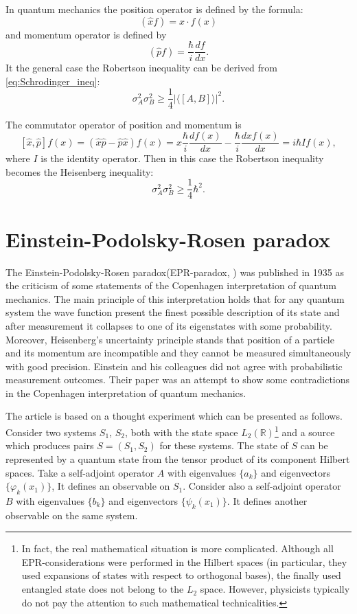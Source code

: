 \documentclass[%
master,         %
subf,           %
href,           %
colorlinks=true %
]{disser}
\numberwithin{equation}{section}
\numberwithin{figure}{section}
\begin{document}
In quantum mechanics the position operator is defined by the formula:
\[
(\hat{x}f) = x\cdot f(x)
\]
and momentum operator is defined by
\[
(\hat{p}f) = \frac{\hbar}{i}\frac{df}{dx}.
\]
It the general case the Robertson inequality can be derived from \eqref{eq:Schrodinger_ineq}:
\[
\sigma_A^2\sigma_B^2 \geq \frac{1}{4}|\langle [A, B]\rangle|^2.
\]

The commutator operator of position and momentum is 
\[
[\hat{x}, \hat{p}]f(x) = (\hat{x}\hat{p} - \hat{p}\hat{x})f(x) = x\frac{\hbar}{i}\frac{df(x)}{dx} - \frac{\hbar}{i}\frac{d xf(x)}{dx} = i\hbar If(x),
\]
where $I$ is the identity operator. Then in this case the Robertson inequality becomes the Heisenberg inequality:
\[
\sigma_A^2\sigma_B^2 \geq \frac{1}{4}\hbar^2.
\]


\section{Einstein-Podolsky-Rosen paradox}
The Einstein-Podolsky-Rosen paradox(EPR-paradox, \cite{EPR}) was published in 1935 as the criticism of some statements of the Copenhagen interpretation of quantum mechanics. The main principle of this interpretation holds that for any quantum system the wave function present the finest possible description of its state and after measurement it collapses to one of its eigenstates with some probability. Moreover, Heisenberg's uncertainty principle stands that position of a particle and its momentum are incompatible and they cannot be measured simultaneously with good precision. Einstein and his colleagues did not agree with probabilistic measurement outcomes. Their paper was an attempt to show some contradictions in the Copenhagen interpretation of quantum mechanics.

The article \cite{EPR} is based on a thought experiment which can be presented as follows. Consider two systems $S_1$, $S_2$, both with the state space $L_2(\mathbb{R})$\footnote{In fact, the real mathematical situation is more complicated. Although all EPR-considerations were performed in the Hilbert spaces (in particular, they used expansions of states with respect to orthogonal  bases), the finally used entangled state does not belong to the $L_2$ space. However, physicists typically do not pay the attention to such mathematical technicalities.} and a source which produces pairs $S=(S_1, S_2)$ for these systems. The state of $S$ can be represented by a quantum state from the tensor product of its component Hilbert spaces.
Take a self-adjoint operator $A$ with eigenvalues $\{a_k\}$ and eigenvectors $\{\varphi_k(x_1)\}$, It defines an observable on $S_1$. Consider also a self-adjoint operator $B$  with eigenvalues $\{b_k\}$ and eigenvectors $\{\psi_k(x_1)\}$. It defines another observable on the same system. 
\end{document}
